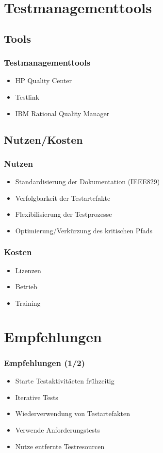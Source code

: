 \section{Testmanagementtools}
\subsection{Tools}
\begin{frame}
	\frametitle{Testmanagementtools}
	\begin{itemize}
		\item HP Quality Center
		\item Testlink
		\item IBM Rational Quality Manager
	\end{itemize}
\end{frame}

\subsection{Nutzen/Kosten}
\begin{frame}
	\frametitle{Nutzen}
	\begin{itemize}
		\item Standardisierung der Dokumentation (IEEE829)
		\item Verfolgbarkeit der Testartefakte
		\item Flexibilisierung der Testprozesse
		\item Optimierung/Verk\"urzung des kritischen Pfads
	\end{itemize}
\end{frame}

\begin{frame}
	\frametitle{Kosten}
	\begin{itemize}
		\item Lizenzen
		\item Betrieb
		\item Training
	\end{itemize}
\end{frame}

\section{Empfehlungen}
\begin{frame}
	\frametitle{Empfehlungen (1/2)}
	\begin{itemize}
		\item Starte Testaktivit\"aeten fr\"uhzeitig
		\item Iterative Tests
		\item Wiederverwendung von Testartefakten
		\item Verwende Anforderungstests
		\item Nutze entfernte Testresourcen
	\end{itemize}
\end{frame}

